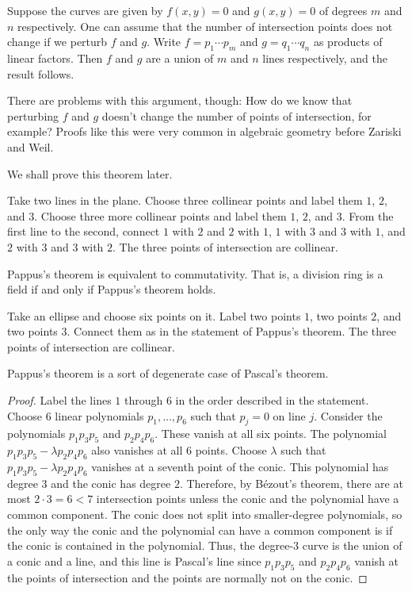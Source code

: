 \documentclass [11 pt, oneside, margin = 1 in] {article}
\begin{document}
Suppose the curves are given by $f(x,y)=0$ and $g(x,y)=0$ of degrees $m$ and $n$ respectively. One can assume that the number of intersection points does not change if we perturb $f$ and $g$. Write $f=p_1\cdots p_m$ and $g = q_1\cdots q_n$ as products of linear factors. Then $f$ and $g$ are a union of $m$ and $n$ lines respectively, and the result follows.

There are problems with this argument, though: How do we know that perturbing $f$ and $g$ doesn't change the number of points of intersection, for example? Proofs like this were very common in algebraic geometry before Zariski and Weil.

We shall prove this theorem later.

\begin{theorem}[Pappus]\label{}\text{}
Take two lines in the plane. Choose three collinear points and label them $1$, $2$, and $3$. Choose three more collinear points and label them $1$, $2$, and $3$. From the first line to the second, connect $1$ with $2$ and $2$ with $1$, $1$ with $3$ and $3$ with $1$, and $2$ with $3$ and $3$ with $2$. The three points of intersection are collinear.
\end{theorem}

\begin{remark}
	Pappus's theorem is equivalent to commutativity. That is, a division ring is a field if and only if Pappus's theorem holds.
\end{remark}

\begin{theorem}[Pascal]\label{}\text{}
Take an ellipse and choose six points on it. Label two points $1$, two points $2$, and two points $3$. Connect them as in the statement of Pappus's theorem. The three points of intersection are collinear. 
\end{theorem}

\begin{remark}
	Pappus's theorem is a sort of degenerate case of Pascal's theorem.
\end{remark}

\begin{proof}
Label the lines $1$ through $6$ in the order described in the statement. Choose $6$ linear polynomials $p_1,\hdots, p_{6}$ such that $p_j = 0$ on line $j$. Consider the polynomials $p_1p_3p_5$ and $p_2p_4p_6$. These vanish at all six points. The polynomial $p_1p_3p_5 - \lambda p_2p_4p_6$ also vanishes at all $6$ points. Choose $\lambda$ such that $p_1p_3p_5 - \lambda p_2p_4p_6$ vanishes at a seventh point of the conic. This polynomial has degree $3$ and the conic has degree $2$. Therefore, by B\'ezout's theorem, there are at most $2\cdot 3 = 6<7$ intersection points unless the conic and the polynomial have a common component. The conic does not split into smaller-degree polynomials, so the only way the conic and the polynomial can have a common component is if the conic is contained in the polynomial. Thus, the degree-$3$ curve is the union of a conic and a line, and this line is Pascal's line since $p_1p_3p_5$ and $p_2p_4p_6$ vanish at the points of intersection and the points are normally not on the conic. 
\end{proof}
\end{document}
